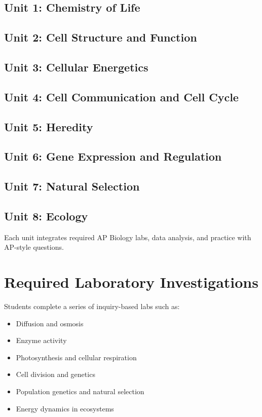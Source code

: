 \documentclass[12pt,oneside]{book}
\begin{document}
\subsection*{Unit 1: Chemistry of Life}
\subsection*{Unit 2: Cell Structure and Function}
\subsection*{Unit 3: Cellular Energetics}
\subsection*{Unit 4: Cell Communication and Cell Cycle}
\subsection*{Unit 5: Heredity}
\subsection*{Unit 6: Gene Expression and Regulation}
\subsection*{Unit 7: Natural Selection}
\subsection*{Unit 8: Ecology}

Each unit integrates required AP Biology labs, data analysis, and practice with AP-style questions.

\section{Required Laboratory Investigations}
Students complete a series of inquiry-based labs such as:
\begin{itemize}[leftmargin=2em]
    \item Diffusion and osmosis
    \item Enzyme activity
    \item Photosynthesis and cellular respiration
    \item Cell division and genetics
    \item Population genetics and natural selection
    \item Energy dynamics in ecosystems
\end{itemize}
\end{document}
